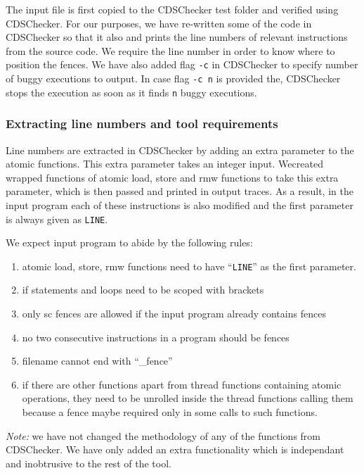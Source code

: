 The input file is first copied to the CDSChecker test folder and 
verified using CDSChecker. 
For our purposes, we have re-written some of the code in CDSChecker 
so that it also and prints the line numbers of relevant instructions 
from the source code. We require the line number in order to know 
where to position the fences. We have also added flag \texttt{-c} 
in CDSChecker to specify number of buggy executions to output. In 
case flag \texttt{-c n} is provided the, CDSChecker stops the execution 
as soon as it finds \texttt{n} buggy executions.


\subsubsection{Extracting line numbers and tool requirements}
Line numbers are extracted in CDSChecker by adding an extra parameter 
to the atomic functions. This extra parameter takes an integer input. 
Wecreated wrapped functions of atomic load, store and rmw functions 
to take this extra parameter, which is then passed and printed in 
output traces. As a result, in the input program each of these 
instructions is also modified and the first parameter is always 
given as {\tt{\textunderscore\textunderscore LINE\textunderscore\textunderscore}}.

We expect input program to abide by the following rules:
\begin{enumerate}
	\item atomic load, store, rmw functions need to have 
	``{\tt{\textunderscore\textunderscore LINE\textunderscore\textunderscore}}'' 
	as the first parameter.
	\item if statements and loops need to be scoped with 
	brackets %
	\item only sc fences are allowed if the input program 
	already contains fences
	\item no two consecutive instructions in a program should be fences 
	\item filename cannot end with ``\_fence''
	\item if there are other functions apart from thread functions 
	containing atomic operations, they need to be unrolled inside the 
	thread functions calling them because a fence maybe required only 
	in some calls to such functions.
\end{enumerate}

\textit{Note:} we have not changed the methodology of any of the functions
from CDSChecker. We have only added an extra functionality which is independant
and inobtrusive to the rest of the tool.

